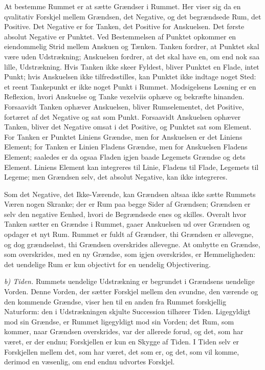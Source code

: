 \documentclass[12pt,a4paper]{book}
\newcommand{\runin}[1]{\emph{#1}\hspace{0.4em}}
\begin{document}
At bestemme Rummet er at sætte Grændser i Rummet. Her viser sig da en
qvalitativ Forskjel mellem Grændsen, det Negative, og det begrændsede
Rum, det Positive. Det Negative er for Tanken, det Positive for
Anskuelsen. Det første absolut Negative er Punktet. Ved Bestemmelsen
af Punktet opkommer en eiendommelig Strid mellem Anskuen og Tænken.
Tanken fordrer, at Punktet skal være uden Udstrækning; Anskuelsen
fordrer, at det skal have en, om
end nok saa lille, Udstrækning. Hvis Tanken ikke skeer Fyldest, bliver
Punktet en Flade, intet Punkt; hvis Anskuelsen ikke tilfredsstilles,
kan Punktet ikke indtage noget Sted: et reent Tankepunkt er ikke noget
Punkt i Rummet. Modsigelsens Løsning er en Reflexion, hvori Anskuelse
og Tanke vexelviis ophæve og bekræfte hinanden. Forsaavidt Tanken
ophæver Anskuelsen, bliver Rumselementet, det Positive, fortæret af det
Negative og sat som Punkt. Forsaavidt Anskuelsen ophæver Tanken,
bliver det Negative omsat i det Positive, og Punktet sat som Element.
For Tanken er Punktet Liniens Grændse, men for Anskuelsen er det
Liniens Element; for Tanken er Linien Fladens Grændse, men for
Anskuelsen Fladens Element; saaledes er da ogsaa Fladen igjen baade
Legemets Grændse og dets Element. Liniens Element kan integreres til
Linie, Fladens til Flade, Legemets til Legeme; men Grændsen selv, det
absolut Negative, kan ikke integreres.

Som det Negative, det Ikke-Værende, kan Grændsen altsaa ikke sætte
Rummets Væren nogen Skranke; der er Rum paa begge Sider af Grændsen;
Grændsen er selv den negative Eenhed, hvori de Begrændsede enes og
skilles. Overalt hvor Tanken sætter en Grændse i Rummet, gaaer
Anskuelsen ud over Grændsen og opdager et nyt Rum. Rummet er fuldt af
Grændser, thi Grændsen er allevegne, og dog grændseløst, thi Grændsen
overskrides allevegne. At ombytte en Grændse, som overskrides, med en
ny Grændse, som igjen overskrides, er Hemmeligheden: det uendelige Rum
er kun objectivt for en uendelig Objectivering.

\runin{b) Tiden.} Rummets uendelige Udstrækning er begrundet i
Grændsens uendelige Vorden. Denne Vorden, der sætter Forskjel mellem
den svundne, den værende og den kommende Grændse, viser hen til en
anden fra Rummet forskjellig Naturform: den i Udstrækningen skjulte
Succession
tilhører Tiden. Ligegyldigt mod sin Grændse, er Rummet ligegyldigt mod
sin Vorden; det Rum, som kommer, naar Grændsen overskrides, var der
allerede forud, og det, som har været, er der endnu; Forskjellen er kun
en Skygge af Tiden. I Tiden selv er Forskjellen mellem det, som har
været, det som er, og det, som vil komme, derimod en væsenlig, om end
endnu udvortes Forskjel.
\end{document}
